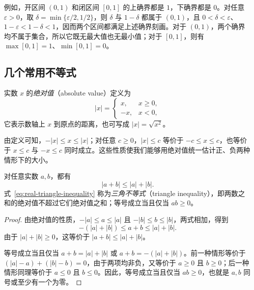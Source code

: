例如，开区间 $(0,1)$ 和闭区间 $[0,1]$ 的上确界都是 $1$，下确界都是 $0$。对任意 $\varepsilon>0$，取 $\delta=\min\{\varepsilon/2,1/2\}$，则 $\delta$ 与 $1-\delta$ 都属于 $(0,1)$，且 $0<\delta<\varepsilon$、$1-\varepsilon<1-\delta<1$，因而两个区间都满足上述确界刻画。对于 $(0,1)$，两个确界均不属于集合，所以它既无最大值也无最小值；对于 $[0,1]$，则有 $\max[0,1]=1$、$\min[0,1]=0$。

\subsection{几个常用不等式}
\label{subsec:common-inequalities}

\begin{definition}
\label{def:real-absolute-value}
实数 $x$ 的\emph{绝对值}（absolute value）定义为
\[
    |x|=
    \begin{cases}
        x, & x\geq 0,\\
        -x, & x<0,
    \end{cases}
\]
它表示数轴上 $x$ 到原点的距离，也可写成 $|x|=\sqrt{x^2}$。
\end{definition}

由定义可知，$-|x|\leq x\leq |x|$；对任意 $c\geq 0$，$|x|\leq c$ 等价于 $-c\leq x\leq c$，也等价于 $x\leq c$ 与 $-x\leq c$ 同时成立。这些性质使我们能够用绝对值统一估计正、负两种情形下的大小。

\begin{proposition}[三角不等式]
\label{prop:real-triangle-inequality}
对任意实数 $a,b$，都有
\begin{equation}
    |a+b|\leq |a|+|b|.
    \label{eq:real-triangle-inequality}
\end{equation}
式~\eqref{eq:real-triangle-inequality} 称为\emph{三角不等式}（triangle inequality），即两数之和的绝对值不超过它们绝对值之和；等号成立当且仅当 $ab\geq 0$。
\end{proposition}

\begin{proof}
由绝对值的性质，$-|a|\leq a\leq |a|$ 且 $-|b|\leq b\leq |b|$，两式相加，得到
\[
    -(|a|+|b|)\leq a+b\leq |a|+|b|.
\]
由于 $|a|+|b|\geq 0$，这等价于 $|a+b|\leq |a|+|b|$。

等号成立当且仅当 $a+b=|a|+|b|$ 或 $a+b=-(|a|+|b|)$。前一种情形等价于 $(|a|-a)+(|b|-b)=0$，由于两项均非负，又等价于 $a\geq 0$ 且 $b\geq 0$；后一种情形同理等价于 $a\leq 0$ 且 $b\leq 0$。因此，等号成立当且仅当 $ab\geq 0$，也就是 $a,b$ 同号或至少有一个为零。
\end{proof}

